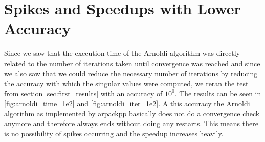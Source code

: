 \documentclass[a4paper, oneside]{discothesis}
\begin{document}
\section{Spikes and Speedups with Lower Accuracy}
Since we saw that the execution time of the Arnoldi algorithm was directly related to the number of iterations taken until convergence was reached and since we also saw that we could reduce the necessary number of iterations by reducing the accuracy with which the singular values were computed, we reran the test from section \ref{sec:first_results} with an accuracy of $10^0$.
The results can be seen in \ref{fig:arnoldi_time_1e2} and \ref{fig:arnoldi_iter_1e2}.
A this accuracy the Arnoldi algorithm as implemented by arpackpp basically does not do a convergence check anymore and therefore always ends without doing any restarts.
This means there is no possibility of spikes occurring and the speedup increases heavily.
\end{document}
